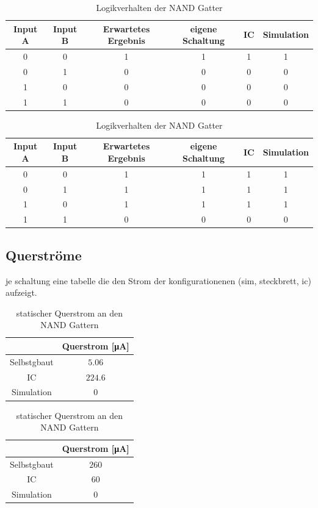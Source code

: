 \documentclass[11pt, a4paper]{article}
\begin{document}
\begin{table}[H]
	\center
	\begin{tabular}{c|c||c||c|c|c}
	Input A 	& Input B 	& Erwartetes Ergebnis 	& eigene Schaltung & IC & Simulation	\\ \hline
	0 & 0 & 1 & 1 & 1 & 1		\\
	0 & 1 & 0 & 0 & 0 & 0		\\
	1 & 0 & 0 & 0 & 0 & 0		\\
	1 & 1 & 0 & 0 & 0 & 0		\\
	\end{tabular}
	\caption{Logikverhalten der NOR Gatter}
	\label{logikNOR}


	\center
	\begin{tabular}{c|c||c||c|c|c}
	Input A 	& Input B 	& Erwartetes Ergebnis 	& eigene Schaltung & IC & Simulation	\\ \hline
	0 & 0 & 1 & 1 & 1 & 1		\\
	0 & 1 & 1 & 1 & 1 & 1		\\
	1 & 0 & 1 & 1 & 1 & 1		\\
	1 & 1 & 0 & 0 & 0 & 0		\\
	\end{tabular}
	\caption{Logikverhalten der NAND Gatter}
	\label{logikNOR}
\end{table}

\subsection*{Querströme}
je schaltung eine tabelle die den Strom der konfigurationenen (sim, steckbrett, ic) aufzeigt.

\begin{table}[H]
	\center
	\begin{tabular}{c|c}
	& Querstrom [\si{\micro\ampere}]	\\ \hline
	Selbstgbaut & $5.06$ 		\\
	IC 			& $224.6$ 		\\
	Simulation 	& $0$\\
	\end{tabular}
	\caption{statischer Querstrom an den NOR Gattern}
	\label{querstromNAND}



	\center
	\begin{tabular}{c|c}
	& Querstrom [\si{\micro\ampere}]	\\ \hline
	Selbstgbaut & $260$ 		\\
	IC 			& $60$ 			\\
	Simulation 	& $0$\\
	\end{tabular}
	\caption{statischer Querstrom an den NAND Gattern}
	\label{querstromNAND}
\end{table}
\end{document}
